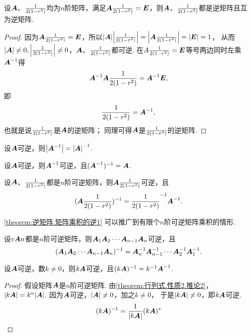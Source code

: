 \begin{property}\label{theorem:逆矩阵.逆矩阵的对称性}
设\(\A\)、\(\B\)均为\(n\)阶矩阵，满足\(\A\B=\E\)，则\(\A\)、\(\B\)都是逆矩阵且互为逆矩阵.
\begin{proof}
因为\(\A\B=\E\)，所以\(\abs{\A}\abs{\B}=\abs{\A\B}=\abs{\E}=1\)，
从而\(\abs{\A}\neq0,\abs{\B}\neq0\)，\(\A\)、\(\B\)都可逆.
在\(A\B=\E\)等号两边同时左乘\(\A^{-1}\)得\[
	\A^{-1}\A\B=\A^{-1}\E,
\]即\[
	\B=\A^{-1},
\]
也就是说\(\B\)是\(\A\)的逆矩阵；
同理可得\(\A\)是\(\B\)的逆矩阵.
\end{proof}
\end{property}

\begin{property}\label{theorem:逆矩阵.逆矩阵的行列式}
设\(\A\)可逆，则\(\abs{\A^{-1}}=\abs{\A}^{-1}\).
\end{property}

\begin{property}\label{theorem:逆矩阵.逆矩阵的逆}
设\(\A\)可逆，则\(\A^{-1}\)可逆，且\((\A^{-1})^{-1}=\A\).
\end{property}

\begin{property}\label{theorem:逆矩阵.矩阵乘积的逆1}
设\(\A\)、\(\B\)都是\(n\)阶可逆矩阵，则\(\A\B\)可逆，且\begin{equation}
(\A \B)^{-1} = \B^{-1} \A^{-1}.
\end{equation}
\end{property}

\cref{theorem:逆矩阵.矩阵乘积的逆1} 可以推广到有限个\(n\)阶可逆矩阵乘积的情形.
\begin{property}\label{theorem:逆矩阵.矩阵乘积的逆2}
设\(\v{\A}{n}\)都是\(n\)阶可逆矩阵，则\(\A_1 \A_2 \dotsm \A_{n-1} \A_n\)可逆，且\begin{equation}
(\A_1 \A_2 \dotsm \A_{n-1} \A_n)^{-1}
= \A_n^{-1} \A_{n-1}^{-1} \dotsm \A_2^{-1} \A_1^{-1}.
\end{equation}
\end{property}

\begin{property}\label{theorem:逆矩阵.数与矩阵乘积的逆}
设\(\A\)可逆，数\(k\neq0\)，则\(k\A\)可逆，且\((k\A)^{-1}=k^{-1}\A^{-1}\).
\begin{proof}
假设矩阵\(\A\)是\(n\)阶可逆矩阵.
由\cref{theorem:行列式.性质2.推论2}，
\(\abs{k\A} = k^n\abs{\A}\).
因为\(\A\)可逆，\(\abs{\A}\neq0\)，加之\(k\neq0\)，
于是\(\abs{k\A}\neq0\)，即\(k\A\)可逆.\[
(k\A)^{-1} = \frac{1}{\abs{k\A}} (k\A)^*
\]
\end{proof}
\end{property}

